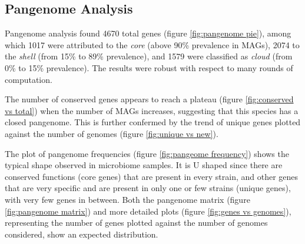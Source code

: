 \subsection*{Pangenome Analysis}
\graphicspath{{images/pangenomeAnalysis}}






Pangenome analysis found 4670 total genes (figure \ref{fig:pangenome pie}), 
among which 1017 were attributed to the \emph{core} (above 90\% prevalence in MAGs),
2074 to the \emph{shell} (from 15\% to 89\% prevalence), and 1579 were classified as \emph{cloud}
(from 0\% to 15\% prevalence). The results were robust with respect to many rounds of computation.

The number of conserved genes appears to reach a plateau (figure \ref{fig:conserved vs total})
when the number of MAGs increases, suggesting that this species has a closed pangenome.
This is further confermed by the trend of unique genes plotted against the number of
genomes (figure \ref{fig:unique vs new}).

The plot of pangenome frequencies (figure \ref{fig:pangeome frequency}) shows the typical shape observed in microbiome samples.
It is U shaped since there are conserved functions (core genes) that are present in every strain, and
other genes that are very specific and are present in only one or few strains (unique genes), with very few genes in between.
Both the pangenome matrix (figure \ref{fig:pangenome matrix}) and more detailed plots (figure \ref{fig:genes vs genomes}),
representing the number of genes plotted against the number of genomes considered,
show an expected distribution.


